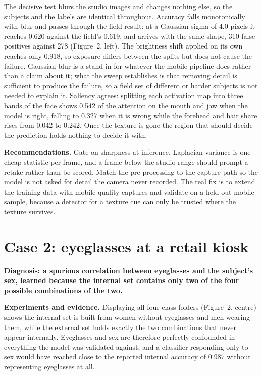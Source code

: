 \documentclass[10pt,a4paper,twocolumn]{article}
\begin{document}
The decisive test blurs the studio images and changes nothing else, so the subjects and the labels
are identical throughout. Accuracy falls monotonically with blur and passes through the field
result: at a Gaussian sigma of 4.0 pixels it reaches 0.620 against the field's
0.619, and arrives with the same shape, 310 false positives against 278
(Figure~2, left). The brightness shift applied on its own reaches only 0.918, so exposure
differs between the splits but does not cause the failure. Gaussian blur is a stand-in for whatever
the mobile pipeline does rather than a claim about it; what the sweep establishes is
that removing detail is sufficient to produce the failure, so a field set of different or harder
subjects is not needed to explain it. Saliency agrees: splitting each activation map into three
bands of the face shows 0.542 of the attention on the mouth and jaw when the model is
right, falling to 0.327 when it is wrong while the forehead and hair share rises from
0.042 to 0.242. Once the texture is gone the region that should
decide the prediction holds nothing to decide it with.

\textbf{Recommendations.} Gate on sharpness at inference. Laplacian variance is one cheap statistic
per frame, and a frame below the studio range should prompt a retake rather than be scored. Match
the pre-processing to the capture path so the model is not asked for detail the camera never
recorded. The real fix is to extend the training data with mobile-quality captures and validate on
a held-out mobile sample, because a detector for a texture cue can only be trusted where the
texture survives.

\section{Case 2: eyeglasses at a retail kiosk}
\textbf{Diagnosis: a spurious correlation between eyeglasses and the subject's sex, learned because
the internal set contains only two of the four possible combinations of the two.}

\textbf{Experiments and evidence.} Displaying all four class folders (Figure~2, centre) shows the internal set is
built from women without eyeglasses and men wearing them, while the external set holds exactly the
two combinations that never appear internally. Eyeglasses and sex are therefore perfectly
confounded in everything the model was validated against, and a classifier responding only to sex
would have reached close to the reported internal accuracy of 0.987 without representing
eyeglasses at all.
\end{document}
